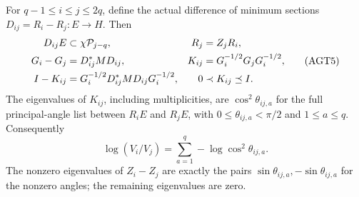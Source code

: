 \begin{theorem}
For $q-1\le i\le j\le2q$, define the actual difference of
minimum sections $D_{ij}=R_i-R_j:E\to H$. Then
\[
 \begin{aligned}
 D_{ij}E&\subset\chi\mathcal P_{j-q},& R_j&=Z_jR_i,\\
 G_i-G_j&=D_{ij}^*M D_{ij},&
 K_{ij}&=G_i^{-1/2}G_jG_i^{-1/2},\\
 I-K_{ij}&=G_i^{-1/2}D_{ij}^*M D_{ij}G_i^{-1/2},&
 0&\prec K_{ij}\preceq I.
 \end{aligned}
 \tag{AGT5}
\]
The eigenvalues of $K_{ij}$, including multiplicities, are
$\cos^2\theta_{ij,a}$ for the full principal-angle list between
$R_iE$ and $R_jE$, with $0\le\theta_{ij,a}<\pi/2$ and
$1\le a\le q$. Consequently
\[
 \log(V_i/V_j)=\sum_{a=1}^q-\log\cos^2\theta_{ij,a}.
 \tag{AGT6}
\]
The nonzero eigenvalues of $Z_i-Z_j$ are exactly the pairs
$\sin\theta_{ij,a},-\sin\theta_{ij,a}$ for the nonzero angles;
the remaining eigenvalues are zero.
\end{theorem}
